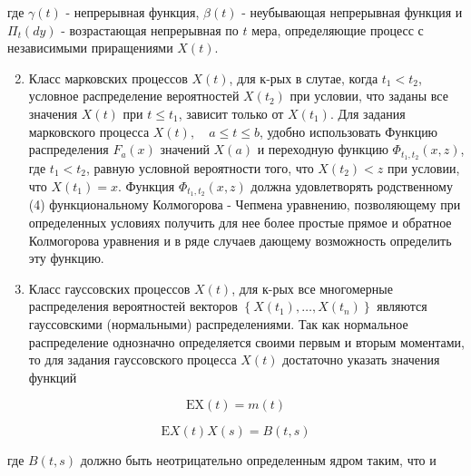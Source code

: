 \documentclass[10pt]{article}
\begin{document}
где $\gamma(t)$ - непрерывная функция, $\beta(t)$ - неубывающая непрерывная функция и $\Pi_{t}(d y)$ - возрастающая непрерывная по $t$ мера, определяющие процесс с независимыми приращениями $X(t)$.



\begin{enumerate}

  \setcounter{enumi}{1}

  \item Класс марковских процессов $X(t)$, для к-рых в слутае, когда $t_{1}<t_{2}$, условное распределение вероятностей $X\left(t_{2}\right)$ при условии, что заданы все значения $X(t)$ при $t \leqslant t_{1}$, зависит только от $X\left(t_{1}\right)$. Для задания марковского процесса $X(t), \quad a \leqslant t \leqslant b$, удобно использовать Функцию распределения $F_{a}(x)$ значений $X(a)$ и переходную функцию $\Phi_{t_{1}, t_{2}}(x, z)$, где $t_{1}<t_{2}$, равную условной вероятности того, что $X\left(t_{2}\right)<z$ при условии, что $X\left(t_{1}\right)=x$. Функция $\Phi_{t_{1}, t_{2}}(x, z)$ должна удовлетворять родственному (4) функциональному Колмогорова - Чепмена уравнению, позволяющему при определенных условиях получить для нее более простые прямое и обратное Колмогорова уравнения и в ряде случаев дающему возможность определить эту функцию.



  \item Класс гауссовских процессов $X(t)$, для к-рых все многомерные распределения вероятностей векторов $\left\{X\left(t_{1}\right), \ldots, X\left(t_{n}\right)\right\}$ являются гауссовскими (нормальными) распределениями. Так как нормальное распределение однозначно определяется своими первым и вторым моментами, то для задания гауссовского процесса $X(t)$ достаточно указать значения функций



\end{enumerate}



\[

\mathrm{EX}(t)=m(t)

\]



\[

\mathrm{E} X(t) X(s)=B(t, s)

\]



где $B(t, s)$ должно быть неотрицательно определенным ядром таким, что и
\end{document}
